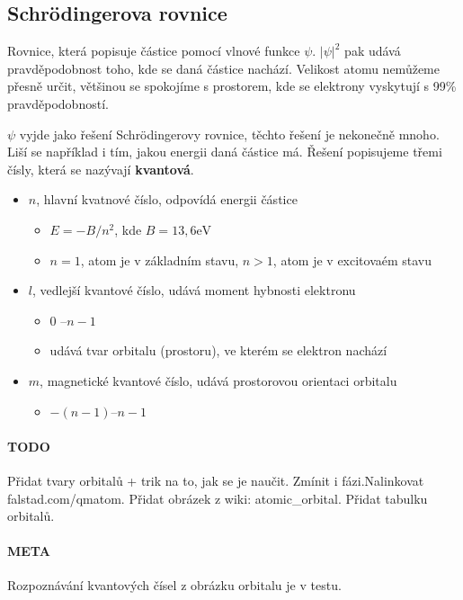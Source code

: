 \documentclass[DIV=8]{scrreprt}
\newcommand{\mybox}[2]{
    \paragraph{#1} #2
}
\begin{document}
\subsection{Schrödingerova rovnice} \label{Schrödingerova rovnice}


Rovnice, která popisuje částice pomocí vlnové funkce \(\psi\). \(|\psi|^2\) pak udává pravděpodobnost toho, kde se daná částice nachází. Velikost atomu nemůžeme přesně určit, většinou se spokojíme s prostorem, kde se elektrony vyskytují s 99\% pravděpodobností.

\(\psi\) vyjde jako řešení Schrödingerovy rovnice, těchto řešení je nekonečně mnoho. Liší se například i tím, jakou energii daná částice má. Řešení popisujeme třemi čísly, která se nazývají \textbf{kvantová}.
\begin{itemize}[nosep]
    \item \(n\), hlavní kvatnové číslo, odpovídá energii částice
\begin{itemize}[nosep]
    \item   \(E = -B/n^2\), kde \(B = 13,6 \text{eV}\)
    \item \(n = 1\), atom je v základním stavu, \(n > 1\), atom je v excitovaém stavu
\end{itemize}

    \item \(l\), vedlejší kvantové číslo, udává moment hybnosti elektronu
\begin{itemize}[nosep]
    \item 0 --\(n-1\)
    \item udává tvar orbitalu (prostoru), ve kterém se elektron nachází
\end{itemize}

    \item \(m\), magnetické kvantové číslo, udává prostorovou orientaci orbitalu
\begin{itemize}[nosep]
    \item \(-(n - 1)\)--\(n-1\)
\end{itemize}

\end{itemize}



\mybox{TODO}{Přidat tvary orbitalů + trik na to, jak se je naučit. Zmínit i fázi.Nalinkovat falstad.com/qmatom. Přidat obrázek z wiki: atomic\_orbital. Přidat tabulku orbitalů.}


\mybox{META}{Rozpoznávání kvantových čísel z obrázku orbitalu je v testu.}
\end{document}
